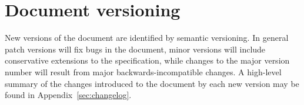 \section{Document versioning}

New versions of the document are identified by semantic versioning. In general patch versions will fix bugs in the document, minor versions will include conservative extensions to the specification, while changes to the major version number will result from major backwards-incompatible changes.
A high-level summary of the changes introduced to the document by each new version may be found in Appendix~\ref{sec:changelog}.
